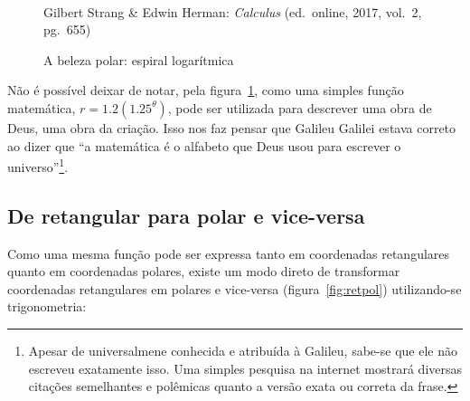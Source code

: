 \begin{figure}[H]
  \begin{center}
    \caption{A beleza polar: espiral logarítmica}
    \label{fig:belo7}
    \\
    \footnotesize{Gilbert Strang \& Edwin Herman: \emph{Calculus}
          (ed.\ online, 2017, vol.\ 2, pg.\ 655)}
  \end{center}
\end{figure}

Não é possível deixar de notar, pela figura~\ref{fig:belo7}, como uma
simples função matemática, $r = 1.2(1.25^\theta)$, pode ser utilizada
para descrever uma obra de Deus, uma obra da criação. Isso nos faz
pensar que Galileu Galilei estava correto ao dizer que ``a matemática
é o alfabeto que Deus usou para escrever o universo''\footnote{Apesar
  de universalmene conhecida e atribuída à Galileu, sabe-se que ele
  não escreveu exatamente isso. Uma simples pesquisa na internet
  mostrará diversas citações semelhantes e polêmicas quanto a versão
  exata ou correta da frase.}.


\subsection{De retangular para polar e vice-versa}
\label{sec:coordpolar-equiv}

Como uma mesma função pode ser expressa tanto em coordenadas
retangulares quanto em coordenadas polares, existe um modo direto de
transformar coordenadas retangulares em polares e vice-versa
(figura~\ref{fig:retpol}) utilizando-se trigonometria:

